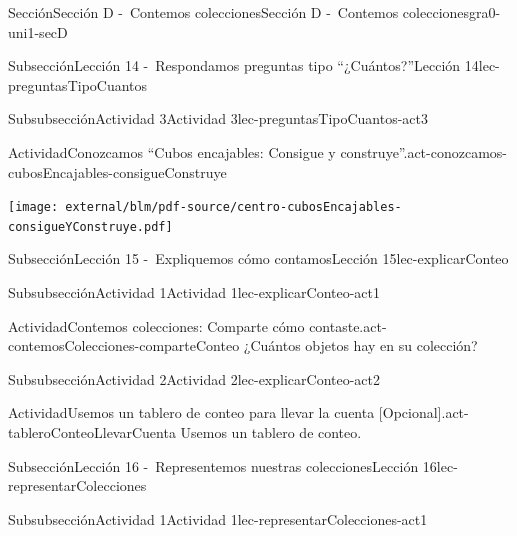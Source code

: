 \begin{sectionptx}{Sección}{Sección D -~Contemos colecciones}{}{Sección D -~Contemos colecciones}{}{}{gra0-uni1-secD}
\begin{subsectionptx}{Subsección}{Lección 14 -~Respondamos preguntas tipo “¿Cuántos?”}{}{Lección 14}{}{}{lec-preguntasTipoCuantos}
\begin{subsubsectionptx}{Subsubsección}{Actividad 3}{}{Actividad 3}{}{}{lec-preguntasTipoCuantos-act3}
\begin{activity}{Actividad}{Conozcamos “Cubos encajables: Consigue y construye”.}{act-conozcamos-cubosEncajables-consigueConstruye}
\begin{cutoutpage}
\clearpage
\texttt{[image: external/blm/pdf-source/centro-cubosEncajables-consigueYConstruye.pdf]}
\end{cutoutpage}
\end{activity}%
\end{subsubsectionptx}
\end{subsectionptx}
%
%
\typeout{************************************************}
\typeout{************************************************}
%
\begin{subsectionptx}{Subsección}{Lección 15 -~Expliquemos cómo contamos}{}{Lección 15}{}{}{lec-explicarConteo}
%
%
\typeout{************************************************}
\typeout{************************************************}
%
\begin{subsubsectionptx}{Subsubsección}{Actividad 1}{}{Actividad 1}{}{}{lec-explicarConteo-act1}
\begin{activity}{Actividad}{Contemos colecciones: Comparte cómo contaste.}{act-contemosColecciones-comparteConteo}%
¿Cuántos objetos hay en su colección?%
\end{activity}%
\end{subsubsectionptx}
%
%
\typeout{************************************************}
\typeout{************************************************}
%
\begin{subsubsectionptx}{Subsubsección}{Actividad 2}{}{Actividad 2}{}{}{lec-explicarConteo-act2}
\begin{activity}{Actividad}{Usemos un tablero de conteo para llevar la cuenta [Opcional].}{act-tableroConteoLlevarCuenta}%
Usemos un tablero de conteo.%
\end{activity}%
\end{subsubsectionptx}
\end{subsectionptx}
%
%
\typeout{************************************************}
\typeout{************************************************}
%
\begin{subsectionptx}{Subsección}{Lección 16 -~Representemos nuestras colecciones}{}{Lección 16}{}{}{lec-representarColecciones}
%
%
\typeout{************************************************}
\typeout{************************************************}
%
\begin{subsubsectionptx}{Subsubsección}{Actividad 1}{}{Actividad 1}{}{}{lec-representarColecciones-act1}

\end{subsubsectionptx}
\end{subsectionptx}
\end{sectionptx}
